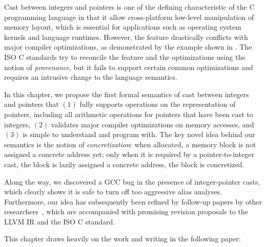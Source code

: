 Cast between integers and pointers is one of the defining characteristic of the C programming
language in that it allow cross-platform low-level manipulation of memory layout, which is essential
for applications such as operating system kernels and language runtimes.  However, the feature
drastically conflicts with major compiler optimizations, as demonstrated by the example shown in
.  The ISO C standards try to reconcile the feature and the optimizations
using the notion of \emph{provenance}, but it fails to support certain common optimizations and
requires an intrusive change to the language semantics.

In this chapter, we propose the first formal semantics of cast between integers and pointers that
$(1)$ fully supports operations on the representation of pointers, including all arithmetic
operations for pointers that have been cast to integers, $(2)$ validates major compiler
optimizations on memory accesses, and $(3)$ is simple to understand and program with.  The key novel
idea behind our semantics is the notion of \emph{concretization}: when allocated, a memory block is
not assigned a concrete address yet; only when it is required by a pointer-to-integer cast, the
block is lazily assigned a concrete address, \ie{} the block is concretized.

Along the way, we discovered a GCC bug in the presence of integer-pointer casts, which clearly shows
it is safe to turn off too aggressive alias analyses.  Furthermore, our idea has subsequently been
refined by follow-up papers by other researchers~\cite{intptrcast-oopsla,intptrcast-popl}, which are
accompanied with promising revision proposals to the LLVM IR and the ISO C standard.


This chapter draws heavily on the work and writing in the following paper:


